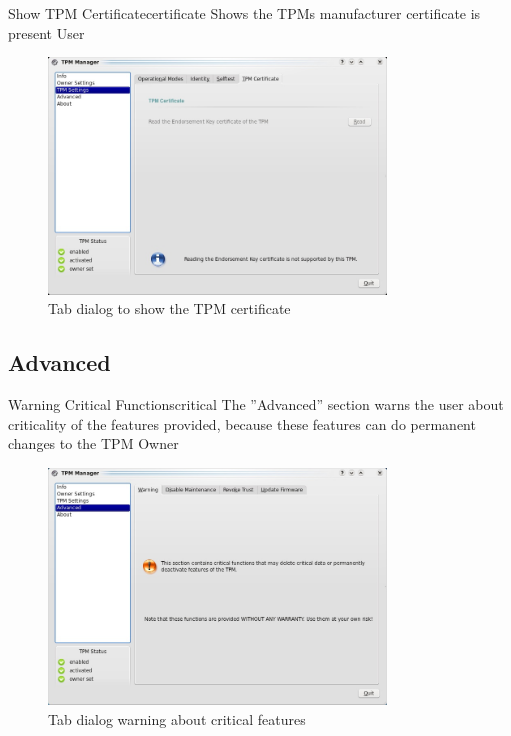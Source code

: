 \documentclass[
  american        %
]{sirrixreport}
\begin{document}
\begin{usecase}{Show TPM Certificate}{certificate}
\ucdesc Shows the TPMs manufacturer certificate is present
\ucactors  User
\end{usecase}

\begin{figure}[h]
 \centering
 \includegraphics[width=0.8\textwidth]{images/uc_tpmcert.jpg}
 \caption{Tab dialog to show the TPM certificate }
\end{figure}
\clearpage


\subsection{Advanced}

\begin{usecase}{Warning Critical Functions}{critical}
\ucdesc The ''Advanced'' section warns the user about criticality of the features provided, because these features can do permanent changes to the TPM
\ucactors Owner
\end{usecase}

\begin{figure}[h]
 \centering
 \includegraphics[width=0.8\textwidth]{images/uc_advanced_warning.jpg}
 \caption{Tab dialog warning about critical features }
\end{figure}
\clearpage
\end{document}
